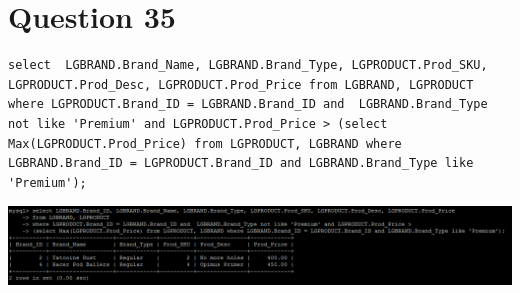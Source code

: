 \documentclass[a4paper,10pt]{article}
\begin{document}
\section {Question 35}
\lstset{
            language=SQL,
            breaklines=true
            }
        \begin{lstlisting}[frame=single]
        select  LGBRAND.Brand_Name, LGBRAND.Brand_Type, LGPRODUCT.Prod_SKU, LGPRODUCT.Prod_Desc, LGPRODUCT.Prod_Price from LGBRAND, LGPRODUCT where LGPRODUCT.Brand_ID = LGBRAND.Brand_ID and  LGBRAND.Brand_Type not like 'Premium' and LGPRODUCT.Prod_Price > (select Max(LGPRODUCT.Prod_Price) from LGPRODUCT, LGBRAND where LGBRAND.Brand_ID = LGPRODUCT.Brand_ID and LGBRAND.Brand_Type like 'Premium');

        \end{lstlisting}
\includegraphics{Queries/Question_35/Question35.PNG}
\end{document}
